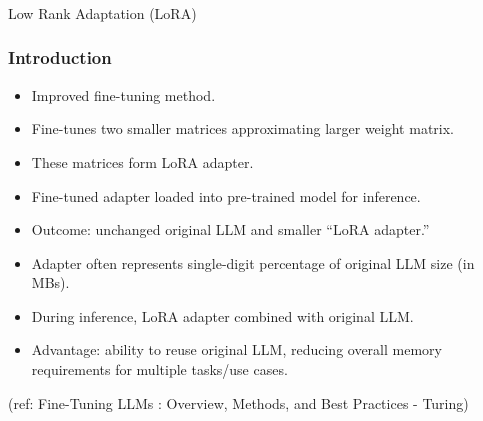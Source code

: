 


\begin{frame}[fragile]\frametitle{}
\begin{center}
{\Large Low Rank Adaptation (LoRA)}
\end{center}
\end{frame}

\begin{frame}[fragile]\frametitle{Introduction}

  \begin{itemize}
    \item Improved fine-tuning method.
    \item Fine-tunes two smaller matrices approximating larger weight matrix.
    \item These matrices form LoRA adapter.
    \item Fine-tuned adapter loaded into pre-trained model for inference.
    \item Outcome: unchanged original LLM and smaller “LoRA adapter.”
    \item Adapter often represents single-digit percentage of original LLM size (in MBs).
    \item During inference, LoRA adapter combined with original LLM.
    \item Advantage: ability to reuse original LLM, reducing overall memory requirements for multiple tasks/use cases.
  \end{itemize}
  
  {\tiny (ref: Fine-Tuning LLMs : Overview, Methods, and Best Practices - Turing)}
  
\end{frame}

